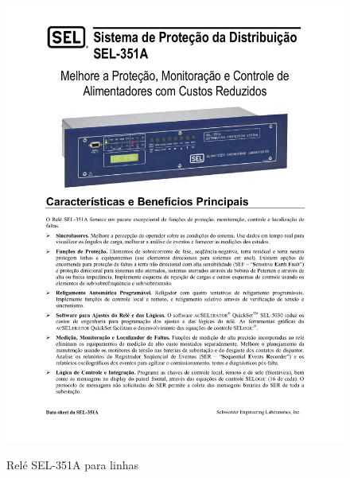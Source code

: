 \documentclass[a5paper]{ufsc-thesis}
\begin{document}
\begin{figure}[htb]
  \caption{Relé SEL-351A para linhas}
  \centering
  \includegraphics[width=16cm]{sel.pdf}
  \label{fig:rele}
\end{figure}
\end{document}
